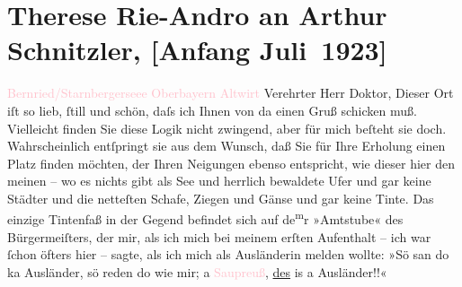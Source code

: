 

               \section[Therese Rie-Andro an Arthur Schnitzler, {[}Anfang Juli 1923{]}]{ Therese Rie-Andro an Arthur Schnitzler, {[}Anfang Juli 1923{]}}\nopagebreak{}\rehead{ }\normalsize\beginnumbering{} \toendnotes[C]{\smallbreak\pagebreak[2]} 
\pstart
           \noindent{}\raggedleft{}{\pb}\textcolor{pink}{Bernried/Starnbergerseee}{}\ledrightnote{\textcolor{pink}{Bernried}}\pend
           \pstart
           \noindent{}\raggedleft{}\textcolor{pink}{Oberbayern}{}\ledrightnote{\textcolor{pink}{Oberbayern}}\pend
           \pstart
           \noindent{}\raggedleft{}\textcolor{pink}{Altwirt}{}\ledrightnote{\textcolor{pink}{Hotel Seeblick}}\pend
           \pstart{}Verehrter Herr Doktor,\pend\pstart
           Dieser Ort iſt so lieb, ſtill und schön, daſs ich Ihnen von da einen Gruß schicken
                    muß. Vielleicht finden Sie diese Logik nicht zwingend, aber für mich beſteht sie
                    doch. Wahrscheinlich entſpringt sie aus dem Wunsch, daß Sie für Ihre Erholung
                    einen Platz finden möchten, der Ihren Neigungen ebenso entspricht, wie dieser
                    hier den meinen – wo es nichts gibt als See und herrlich bewaldete Ufer und gar
                    keine Städter und die netteſten Schafe, Ziegen und Gänse und gar keine Tinte.
                        {\pb}Das einzige Tintenfaß in der Gegend befindet sich
                    auf de\substVorne{}\textsuperscript{m}\substDazwischen{}r\substHinten{} »Amtstube« des Bürgermeiſters, der mir, als ich mich bei meinem erſten
                    Aufenthalt – ich war ſchon öfters hier – sagte, als ich mich als Ausländerin
                    melden wollte: »Sö san do ka Ausländer, sö reden do wie mir; a \textcolor{pink}{Saupreuß}{}\ledrightnote{\textcolor{pink}{Deutschland}}, \uline{des} is a
                    Ausländer!!«\pend
